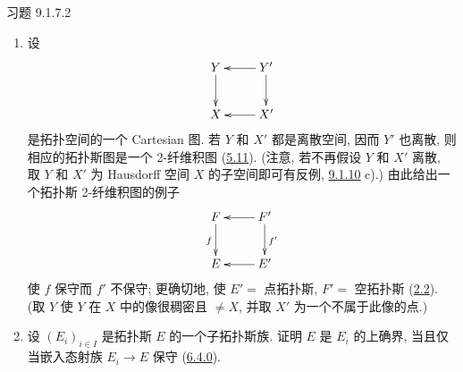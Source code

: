 \begin{enonce*}[remark]{习题 9.1.7.2}
\begin{enumerate}
\item 设\pageoriginale
\[
\xymatrix{
Y \ar[d]& Y'\ar[l] \ar[d]\\
X & X'\ar[l] }
\]
是拓扑空间的一个 Cartesian 图.
若 $Y$ 和 $X'$ 都是离散空间, 因而 $Y'$ 也离散,
则相应的拓扑斯图是一个 2-纤维积图
(\hyperref[IV.prop5.11]{5.11}).
(注意, 若不再假设 $Y$ 和 $X'$ 离散,
取 $Y$ 和 $X'$ 为 Hausdorff 空间 $X$ 的子空间即可有反例,
\cf \hyperref[IV.exer9.1.10]{9.1.10} c).)
由此给出一个拓扑斯 2-纤维积图的例子
\[
\xymatrix{
F \ar[d]_{f}& F'\ar[l] \ar[d]^{f'}\\
E & E'\ar[l] }
\]
使 $f$ 保守而 $f'$ 不保守;
更确切地, 使 $E'=$ 点拓扑斯, $F'=$ 空拓扑斯
(\hyperref[IV.subsec2.2]{2.2}).
(取 $Y$ 使 $Y$ 在 $X$ 中的像很稠密且 $\neq X$,
并取 $X'$ 为一个不属于此像的点.)

\item 设 $(E_i)_{i\in I}$ 是拓扑斯 $E$ 的一个子拓扑斯族.
证明 $E$ 是 $E_i$ 的上确界,
当且仅当嵌入态射族 $E_i\rightarrow E$ 保守
(\hyperref[IV.subsubsec6.4.0]{6.4.0}).
\end{enumerate}
\end{enonce*}

